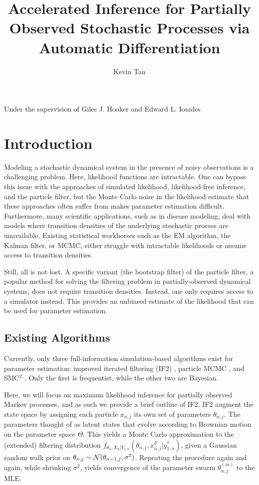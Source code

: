 \documentclass{article}
\title{Accelerated Inference for Partially Observed Stochastic Processes via Automatic Differentiation}
\author{Kevin Tan}
\date{}
\begin{document}
\maketitle

\begin{center}
    Under the supervision of Giles J. Hooker and Edward L. Ionides
\end{center}

\section{Introduction}



Modeling a stochastic dynamical system in the presence of noisy observations is a challenging problem. Here, likelihood functions are intractable. One can bypass this issue with the approaches of simulated likelihood, likelihood-free inference, and the particle filter, but the Monte Carlo noise in the likelihood estimate that these approaches often suffer from makes parameter estimation difficult. Furthermore, many scientific applications, such as in disease modeling, deal with models where transition densities of the underlying stochastic process are unavailable. Existing statistical workhorses such as the EM algorithm, the Kalman filter, or MCMC, either struggle with intractable likelihoods or assume access to transition densities.

Still, all is not lost. A specific variant (the bootstrap filter) of the particle filter, a popular method for solving the filtering problem in partially-observed dynamical systems, does not require transition densities. Instead, one only requires access to a simulator instead. This provides an unbiased estimate of the likelihood \citep{delmoral2004feynman} that can be used for parameter estimation.

\subsection{Existing Algorithms}

Currently, only three full-information simulation-based algorithms exist for parameter estimation: improved iterated filtering (IF2) \citep{ionides15}, particle MCMC \citep{doucet2010pmcmc}, and SMC$^2$ \citep{chopin13}. Only the first is frequentist, while the other two are Bayesian. 

Here, we will focus on maximum likelihood inference for partially observed Markov processes, and as such we provide a brief outline of IF2. IF2 augment the state space by assigning each particle $x_{n,j}$ its own set of parameters $\theta_{n,j}$. The parameters thought of as latent states that evolve according to Brownian motion on the parameter space $\Theta$. This yields a Monte Carlo approximation to the (extended) filtering distribution $f_{\theta_n,X_n|Y_{1:n}}(\theta_{n,j},x_{n,j}^F|y_{1:n}^*)$, given a Gaussian random walk prior on $\theta_{n,j} \sim {\mathcal{N}}(\theta_{n-1,j},\sigma^2)$. Repeating the procedure again and again, while shrinking $\sigma^2$, yields convergence of the parameter swarm $\theta_{n,j}^{(m)}$ to the MLE. 
\end{document}
